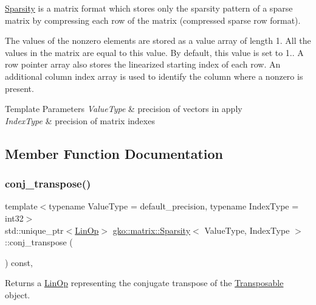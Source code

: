 \hyperlink{classgko_1_1matrix_1_1Sparsity}{Sparsity} is a matrix format which stores only the sparsity pattern of a sparse matrix by compressing each row of the matrix (compressed sparse row format). 

The values of the nonzero elements are stored as a value array of length 1. All the values in the matrix are equal to this value. By default, this value is set to 1.. A row pointer array also stores the linearized starting index of each row. An additional column index array is used to identify the column where a nonzero is present.


\begin{DoxyTemplParams}{Template Parameters}
{\em Value\+Type} & precision of vectors in apply \\
\hline
{\em Index\+Type} & precision of matrix indexes \\
\hline
\end{DoxyTemplParams}


\subsection{Member Function Documentation}
\mbox{\label{classgko_1_1matrix_1_1Sparsity_ac72ca6ceac90d47fce0816e760d22fd2}} 
\subsubsection{\texorpdfstring{conj\+\_\+transpose()}{conj\_transpose()}}
{\footnotesize\ttfamily template$<$typename Value\+Type  = default\+\_\+precision, typename Index\+Type  = int32$>$ \\
std\+::unique\+\_\+ptr$<$\hyperlink{classgko_1_1LinOp}{Lin\+Op}$>$ \hyperlink{classgko_1_1matrix_1_1Sparsity}{gko\+::matrix\+::\+Sparsity}$<$ Value\+Type, Index\+Type $>$\+::conj\+\_\+transpose (\begin{DoxyParamCaption}{ }\end{DoxyParamCaption}) const\hspace{0.3cm}{\ttfamily [override]}, {\ttfamily [virtual]}}



Returns a \hyperlink{classgko_1_1LinOp}{Lin\+Op} representing the conjugate transpose of the \hyperlink{classgko_1_1Transposable}{Transposable} object. 


